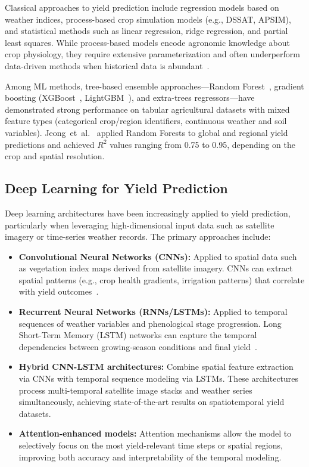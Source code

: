 \documentclass[journal]{IEEEtran}
\begin{document}
Classical approaches to yield prediction include regression models based on weather indices, process-based crop simulation models (e.g., DSSAT, APSIM), and statistical methods such as linear regression, ridge regression, and partial least squares. While process-based models encode agronomic knowledge about crop physiology, they require extensive parameterization and often underperform data-driven methods when historical data is abundant~\cite{peng2020assessing}.

Among ML methods, tree-based ensemble approaches---Random Forest~\cite{breiman2001random,jeong2016random}, gradient boosting (XGBoost~\cite{chen2016xgboost}, LightGBM~\cite{ke2017lightgbm}), and extra-trees regressors---have demonstrated strong performance on tabular agricultural datasets with mixed feature types (categorical crop/region identifiers, continuous weather and soil variables). Jeong~et~al.~\cite{jeong2016random} applied Random Forests to global and regional yield predictions and achieved $R^2$ values ranging from 0.75 to 0.95, depending on the crop and spatial resolution.

\subsection{Deep Learning for Yield Prediction}

Deep learning architectures have been increasingly applied to yield prediction, particularly when leveraging high-dimensional input data such as satellite imagery or time-series weather records. The primary approaches include:

\begin{itemize}[leftmargin=*]
  \item \textbf{Convolutional Neural Networks (CNNs):} Applied to spatial data such as vegetation index maps derived from satellite imagery. CNNs can extract spatial patterns (e.g., crop health gradients, irrigation patterns) that correlate with yield outcomes~\cite{wang2020deep}.
  
  \item \textbf{Recurrent Neural Networks (RNNs/LSTMs):} Applied to temporal sequences of weather variables and phenological stage progression. Long Short-Term Memory (LSTM) networks can capture the temporal dependencies between growing-season conditions and final yield~\cite{khaki2020comprehensive}.
  
  \item \textbf{Hybrid CNN-LSTM architectures:} Combine spatial feature extraction via CNNs with temporal sequence modeling via LSTMs. These architectures process multi-temporal satellite image stacks and weather series simultaneously, achieving state-of-the-art results on spatiotemporal yield datasets.
  
  \item \textbf{Attention-enhanced models:} Attention mechanisms allow the model to selectively focus on the most yield-relevant time steps or spatial regions, improving both accuracy and interpretability of the temporal modeling.
\end{itemize}
\end{document}
